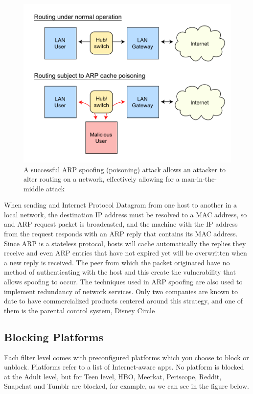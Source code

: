 \begin{figure}[th]
\centering
\includegraphics[width=1\textwidth]{Figures/arp-spoofing}
\decoRule
\caption{A successful ARP spoofing (poisoning) attack allows an attacker to alter routing on a network, effectively allowing for a man-in-the-middle attack}
\label{fig:arp-spoofing}
\end{figure}

When sending and Internet Protocol Datagram from one host to another in a local network, the destination IP address must be resolved to a MAC address, so and ARP request packet is broadcasted, and the machine with the IP address from the request responds with an ARP reply that contains its MAC address. Since ARP is a stateless protocol, hosts will cache automatically the replies they receive and even ARP entries that have not expired yet will be overwritten when a new reply is received. The peer from which the packet originated have no method of authenticating with the host and this create the vulnerability that allows spoofing to occur. The techniques used in ARP spoofing are also used to implement redundancy of network services. Only two companies are known to date to have commercialized products centered around this strategy, and one of them is the parental control system, Disney Circle

\subsection{Blocking Platforms}

Each filter level comes with preconfigured platforms which you choose to block or unblock. Platforms refer to a list of Internet-aware apps. No platform is blocked at the Adult level, but for Teen level, HBO, Meerkat, Periscope, Reddit, Snapchat and Tumblr are blocked, for example, as we can see in the figure below. \parencite{circleMashable}

